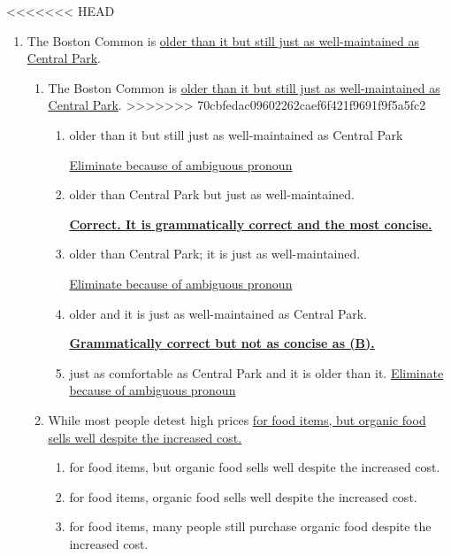 <<<<<<< HEAD
\begin{enumerate}
\item The Boston Common is \ul{ older than it but still just as well-maintained as Central Park}.

\begin{enumerate}[label=(\Alph*)]
=======
\item The Boston Common is \ul{older than it but still just as well-maintained as Central Park}.
>>>>>>> 70cbfedac09602262caef6f421f9691f9f5a5fc2

\begin{enumerate}[label=(\Alph*)]
\item older than it but still just as well-maintained as Central Park 

  \ul{Eliminate because of ambiguous pronoun}
  
\item older than Central Park but just as well-maintained. 

\textbf{\ul{Correct. It is grammatically correct and the most concise.}}

\item  older than Central Park; it is just as well-maintained.   

  \ul{Eliminate because of ambiguous pronoun}
  
\item older and it is just as well-maintained as Central Park. 

\textbf{\ul{Grammatically correct but not as concise as (B).}}

\item just as comfortable as Central Park and it is older than it. \ul{Eliminate because of ambiguous pronoun}

\end{enumerate}

\bigskip
\item While most people detest high prices \ul{for food items, but organic food sells well despite the increased cost.}

\bigskip
\begin{enumerate}[label=(\Alph*)]
\item for food items, but organic food sells well despite the increased cost. \hrulefill
 
\item for food items, organic food sells well despite the increased cost. \hrulefill
 
\item for food items, many people still purchase organic food despite the increased cost. \hrulefill


\end{enumerate}
\end{enumerate}
\end{enumerate}
